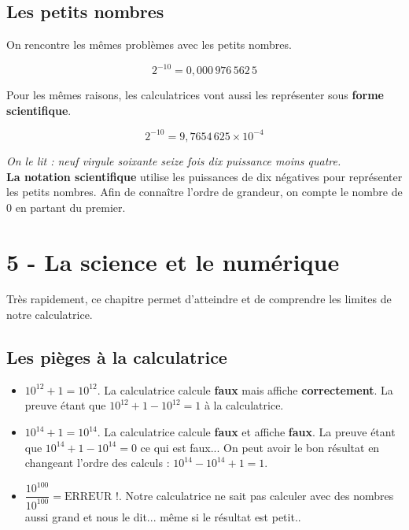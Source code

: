 \newpage

\subsection*{Les petits nombres}

\begin{multicols}{2}

  On rencontre les mêmes problèmes avec les petits nombres.

  $$2^{-10} = 0, 000 \, 976\, 562\, 5$$

  Pour les mêmes raisons, les calculatrices vont aussi les représenter sous \textbf{forme scientifique}.

  $$2^{-10} = 9, 7654 \, 625 \times 10^{-4}$$

  \textit{On le lit : neuf virgule soixante seize fois dix puissance moins quatre.} \\
  \textbf{La notation scientifique} utilise les puissances de dix négatives pour représenter les petits nombres. Afin de connaître l'ordre de grandeur, on compte le nombre de 0 en partant du premier. \\

\end{multicols}
 

\section*{5 - La science et le numérique}

Très rapidement, ce chapitre permet d'atteindre et de comprendre les limites de notre calculatrice. \\

\subsection*{Les pièges à la calculatrice}

  \begin{itemize}[label={$\bullet$}]
  \item $10^{12} + 1 = 10^{12} $. La calculatrice calcule \textbf{faux} mais affiche \textbf{correctement}. La preuve étant que $10^{12} + 1 - 10^{12} = 1$ à la calculatrice.
  \item $10^{14} + 1 = 10^{14} $. La calculatrice calcule \textbf{faux} et affiche \textbf{faux}. La preuve étant que $10^{14} + 1 - 10^{14} = 0$ ce qui est faux... On peut avoir le bon résultat en changeant l'ordre des calculs : $10^14 - 10^14 +1 = 1$.
  \item $\dfrac{10^{100}}{10^{100}} = \text{ERREUR !} $. Notre calculatrice ne sait pas calculer avec des nombres aussi grand et nous le dit... même si le résultat est petit..
  \end{itemize}

